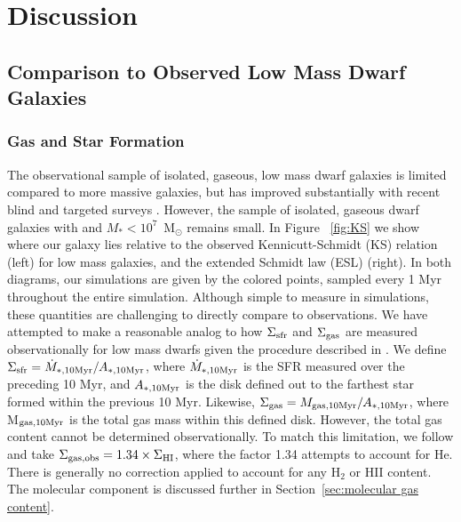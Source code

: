 \documentclass[twocolumn]{aastex61}
\begin{document}
\section{Discussion}
\label{sec:discussion}

\subsection{Comparison to Observed Low Mass Dwarf Galaxies}
\label{sec:observation}

\subsubsection{Gas and Star Formation}
\label{sec:gas_sf}

The observational sample of isolated, gaseous, low mass dwarf galaxies is limited compared to more massive galaxies, but has improved substantially with recent blind and targeted  surveys \citep[e.g.][]{Giovanelli2005, Geha2006, Geha2012, Walter2008, Cannon2011, Haynes2011, Hunter2012, Bradford2015, James2015, Tollerud2015, Sand2015, Wang2017}. However, the sample of isolated, gaseous dwarf galaxies with and $M_{*} < 10^{7}$~M$_{\odot}$ remains small. In Figure ~\ref{fig:KS} we show where our galaxy lies relative to the observed Kennicutt-Schmidt (KS) relation (left) for low mass galaxies, and the extended Schmidt law (ESL) (right). In both diagrams, our simulations are given by the colored points, sampled every 1 Myr throughout the entire simulation. Although simple to measure in simulations, these quantities are challenging to directly compare to observations. We have attempted to make a reasonable analog to how $\Sigma_{\rm sfr}$ and $\Sigma_{\rm gas}$ are measured observationally for low mass dwarfs given the procedure described in \citet{Roychowdhury2014}. We define $\Sigma_{\rm sfr} = \dot{M}_{*, \rm{10 Myr}} / A_{*, \rm{10 Myr}}$, where $\dot{M}_{*, \rm{10 Myr}}$ is the SFR measured over the preceding 10 Myr, and $A_{*, \rm{10 Myr}}$ is the disk defined out to the farthest star formed within the previous 10 Myr. Likewise, $\Sigma_{\rm gas} = M_{\rm gas, 10 Myr} / A_{*, \rm{10 Myr}}$, where M$_{\rm gas, 10 Myr}$ is the total gas mass within this defined disk. However, the total gas content cannot be determined observationally. To match this limitation, we follow \cite{Roychowdhury2014} and take $\Sigma_{\rm gas, obs} = 1.34 \times \Sigma_{\rm HI}$, where the factor 1.34 attempts to account for He. There is generally no correction applied to account for any H$_{2}$ or HII content. The molecular component is discussed further in Section~\ref{sec:molecular gas content}.
\end{document}
